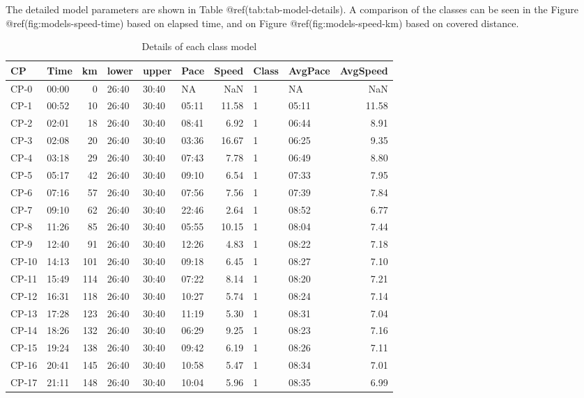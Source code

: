 \documentclass[]{elsarticle} %
\begin{document}
\FloatBarrier

The detailed model parameters are shown in Table
@ref(tab:tab-model-details). A comparison of the classes can be seen in
the Figure @ref(fig:models-speed-time) based on elapsed time, and on
Figure @ref(fig:models-speed-km) based on covered distance.

\begin{longtable}[t]{llrlllrllr}
\caption{\label{tab:tab-model-details}Details of each class model}\\
\toprule
CP & Time & km & lower & upper & Pace & Speed & Class & AvgPace & AvgSpeed\\
\midrule
CP-0 & 00:00 & 0 & 26:40 & 30:40 & NA & NaN & 1 & NA & NaN\\
CP-1 & 00:52 & 10 & 26:40 & 30:40 & 05:11 & 11.58 & 1 & 05:11 & 11.58\\
CP-2 & 02:01 & 18 & 26:40 & 30:40 & 08:41 & 6.92 & 1 & 06:44 & 8.91\\
CP-3 & 02:08 & 20 & 26:40 & 30:40 & 03:36 & 16.67 & 1 & 06:25 & 9.35\\
CP-4 & 03:18 & 29 & 26:40 & 30:40 & 07:43 & 7.78 & 1 & 06:49 & 8.80\\
\addlinespace
CP-5 & 05:17 & 42 & 26:40 & 30:40 & 09:10 & 6.54 & 1 & 07:33 & 7.95\\
CP-6 & 07:16 & 57 & 26:40 & 30:40 & 07:56 & 7.56 & 1 & 07:39 & 7.84\\
CP-7 & 09:10 & 62 & 26:40 & 30:40 & 22:46 & 2.64 & 1 & 08:52 & 6.77\\
CP-8 & 11:26 & 85 & 26:40 & 30:40 & 05:55 & 10.15 & 1 & 08:04 & 7.44\\
CP-9 & 12:40 & 91 & 26:40 & 30:40 & 12:26 & 4.83 & 1 & 08:22 & 7.18\\
\addlinespace
CP-10 & 14:13 & 101 & 26:40 & 30:40 & 09:18 & 6.45 & 1 & 08:27 & 7.10\\
CP-11 & 15:49 & 114 & 26:40 & 30:40 & 07:22 & 8.14 & 1 & 08:20 & 7.21\\
CP-12 & 16:31 & 118 & 26:40 & 30:40 & 10:27 & 5.74 & 1 & 08:24 & 7.14\\
CP-13 & 17:28 & 123 & 26:40 & 30:40 & 11:19 & 5.30 & 1 & 08:31 & 7.04\\
CP-14 & 18:26 & 132 & 26:40 & 30:40 & 06:29 & 9.25 & 1 & 08:23 & 7.16\\
\addlinespace
CP-15 & 19:24 & 138 & 26:40 & 30:40 & 09:42 & 6.19 & 1 & 08:26 & 7.11\\
CP-16 & 20:41 & 145 & 26:40 & 30:40 & 10:58 & 5.47 & 1 & 08:34 & 7.01\\
CP-17 & 21:11 & 148 & 26:40 & 30:40 & 10:04 & 5.96 & 1 & 08:35 & 6.99\\

\end{longtable}
\end{document}
